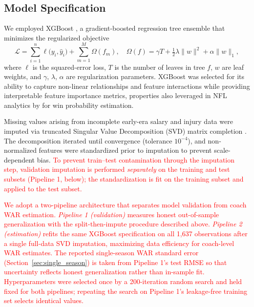 \documentclass[USenglish]{article}
\newcommand{\rev}[1]{\textcolor{red}{#1}}
\theoremstyle{dgthm}
\theoremstyle{dgdef}
\begin{document}
\subsection{Model Specification}

We employed XGBoost \citep{chen2016}, a gradient-boosted regression tree ensemble that minimizes the regularized objective
\begin{equation}
\mathcal{L} = \sum_{i=1}^{n} \ell\!\bigl(y_i, \hat{y}_i\bigr) + \sum_{m=1}^{M} \Omega(f_m), \quad \Omega(f) = \gamma T + \tfrac{1}{2}\lambda \|w\|^2 + \alpha \|w\|_1,
\label{eq:xgboost}
\end{equation}
where $\ell$ is the squared-error loss, $T$ is the number of leaves in tree $f$, $w$ are leaf weights, and $\gamma$, $\lambda$, $\alpha$ are regularization parameters. XGBoost was selected for its ability to capture non-linear relationships and feature interactions while providing interpretable feature importance metrics, properties also leveraged in NFL analytics by \citet{lock2014} for win probability estimation.

Missing values arising from incomplete early-era salary and injury data were imputed via truncated Singular Value Decomposition (SVD) matrix completion \citep{brand2002}. The decomposition iterated until convergence (tolerance $10^{-4}$), and non-normalized features were standardized prior to imputation to prevent scale-dependent bias. \rev{To prevent train--test contamination through the imputation step, validation imputation is performed \emph{separately} on the training and test subsets (Pipeline 1, below); the standardization is fit on the training subset and applied to the test subset.}

\rev{We adopt a two-pipeline architecture that separates model validation from coach WAR estimation. \emph{Pipeline 1 (validation)} measures honest out-of-sample generalization with the split-then-impute procedure described above. \emph{Pipeline 2 (estimation)} refits the same XGBoost specification on all 1,637 observations after a single full-data SVD imputation, maximizing data efficiency for coach-level WAR estimates. The reported single-season WAR standard error (Section~\ref{sec:single_season}) is taken from Pipeline 1's test RMSE so that uncertainty reflects honest generalization rather than in-sample fit. Hyperparameters were selected once by a 200-iteration random search and held fixed for both pipelines; repeating the search on Pipeline 1's leakage-free training set selects identical values.}
\end{document}
